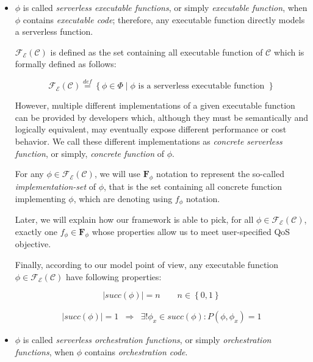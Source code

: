 \documentclass[12pt,a4paper]{report}
\newcommand{\mathDef}{\overset{\textit{def}}{=}}
\theoremstyle{definition}
\begin{document}
\begin{itemize}
	
	\item $\phi$ is called \textit{serverless executable functions}, or simply \textit{executable function}, when $\phi$ contains \textit{executable code}; therefore, any executable function directly models a serverless function.
	
	$\mathscr{F_E}(\mathcal{C})$ is defined as the set containing all executable function of $\mathcal{C}$ which is formally defined as follows:
	
	\begin{equation}
		\mathscr{F_E(\mathcal{C})} \mathDef \left\lbrace \phi \in \Phi \mid \phi \text{ is a serverless executable function }\right\rbrace 
	\end{equation}
	
	However, multiple different implementations of a given executable function can be provided by developers which, although they must be semantically and logically equivalent, may eventually expose different performance or cost behavior. We call these different implementations as \textit{concrete serverless function}, or simply, \textit{concrete function} of $\phi$.
	
	For any $\phi \in \mathscr{F_E}(\mathcal{C})$, we will use $\textbf{F}_{\phi}$ notation to represent the so-called \textit{implementation-set} of $\phi$, that is the set containing all concrete function implementing $\phi$, which are denoting using $f_{\phi}$ notation. 

	Later, we will explain how our framework is able to pick, for all $\phi \in \mathscr{F_E}(\mathcal{C})$, exactly one $f_{\phi} \in \textbf{F}_{\phi}$ whose properties allow us to meet user-specified QoS objective.
	
	Finally, according to our model point of view, any executable function $\phi \in \mathscr{F_E}(\mathcal{C})$ have following properties: 
	
	\begin{equation}\label{eq:executableFP1}
		|succ(\phi)| = n \qquad n \in \left\{0,1\right\}
	\end{equation}

	\begin{eqnarray}\label{eq:executableFP2}
		 |succ(\phi)| = 1 & \Rightarrow & \exists! \phi_x \in succ(\phi) : P(\phi, \phi_x) = 1
	\end{eqnarray}

	\item $\phi$ is called \textit{serverless orchestration functions}, or simply \textit{orchestration functions}, when $\phi$ contains \textit{orchestration code}. 
	

\end{itemize}
\end{document}

